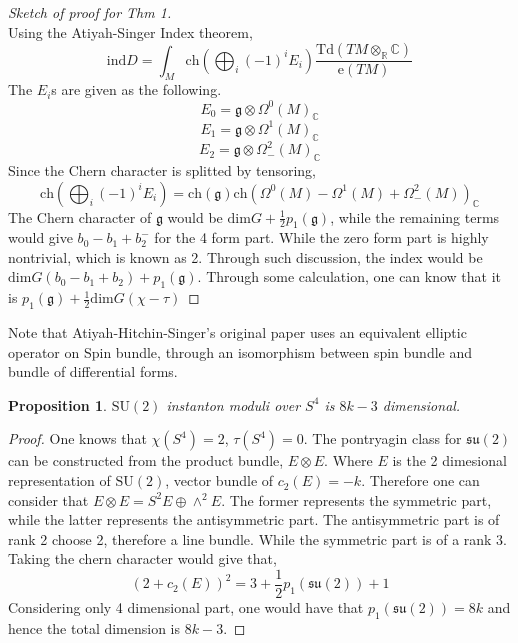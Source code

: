 \documentclass{article}
\newtheorem{prop}{Proposition}
\begin{document}
\begin{proof}[Sketch of proof for Thm 1]
\[    \]
    Using the Atiyah-Singer Index theorem, 
    \[
\mathrm{ind}D = \int_M \mathrm{ch} \left( \bigoplus_i (-1)^i E_i \right) \frac{\mathrm{Td}(TM \otimes_\mathbb{R} \mathbb{C})}{\mathrm{e}(TM)}
\]
The $E_i$s are given as the following.
\[
    E_0 = \mathfrak{g}\otimes \Omega^0(M)_{\mathbb{C}}
\]
\[
    E_1 = \mathfrak{g}\otimes \Omega^1(M)_{\mathbb{C}}
\]
\[
    E_2 = \mathfrak{g}\otimes \Omega^2_{-}(M)_{\mathbb{C}}
\]
Since the Chern character is splitted by tensoring, 
\[
    \mathrm{ch} \left( \bigoplus_i (-1)^i E_i \right)
    = \mathrm{ch}(\mathfrak{g})\mathrm{ch}(\Omega^0(M)-\Omega^1(M)+\Omega^2_{-}(M))_\mathbb{C}
\]
The Chern character of $\mathfrak{g}$ would be $\mathrm{dim}G+\frac{1}{2}p_1(\mathfrak{g})$, while the remaining terms would give $b_0 - b_1 + b_2^{-}$ for the 4 form part. While the zero form part is highly nontrivial, which is known as 2. Through such discussion, the index would be $\mathrm{dim}G (b_0-b_1+b_2)+p_1(\mathfrak{g})$. Through some calculation, one can know that it is $p_1(\mathfrak{g})+\frac{1}{2}\mathrm{dim}G(\chi-\tau)$
\end{proof}
Note that Atiyah-Hitchin-Singer's original paper uses an equivalent elliptic operator on Spin bundle, through an isomorphism between spin bundle and bundle of differential forms. 

\begin{prop}
    $\mathrm{SU}(2)$ instanton moduli over $S^4$ is $8k-3$ dimensional.
\end{prop}
\begin{proof}
    One knows that $\chi(S^4)=2$, $\tau(S^4)=0$. The pontryagin class for $\mathfrak{su}(2)$ can be constructed from the product bundle, $E\otimes E$. Where $E$ is the 2 dimesional representation of $\mathrm{SU}(2)$, vector bundle of $c_2(E)=-k$. Therefore one can consider that $E\otimes E = S^2E\oplus \wedge^2 E$. The former represents the symmetric part, while the latter represents the antisymmetric part. The antisymmetric part is of rank 2 choose 2, therefore a line bundle. While the symmetric part is of a rank 3. Taking the chern character would give that,
    \[
        (2+c_2(E))^2 = 3 + \frac{1}{2}p_1(\mathfrak{su}(2))+1 
    \]
    Considering only 4 dimensional part, one would have that $p_1(\mathfrak{su}(2))=8k$ and hence the total dimension is $8k-3$.
\end{proof}
\end{document}
